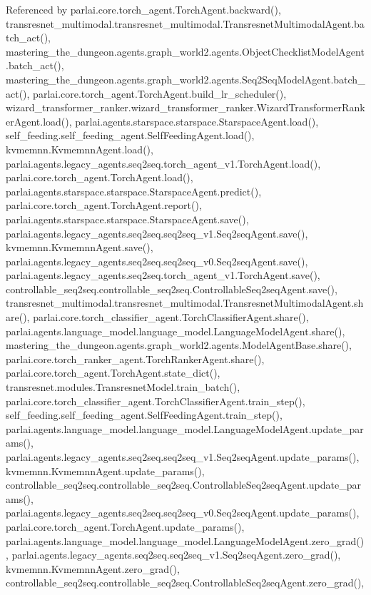 Referenced by parlai.\+core.\+torch\+\_\+agent.\+Torch\+Agent.\+backward(), transresnet\+\_\+multimodal.\+transresnet\+\_\+multimodal.\+Transresnet\+Multimodal\+Agent.\+batch\+\_\+act(), mastering\+\_\+the\+\_\+dungeon.\+agents.\+graph\+\_\+world2.\+agents.\+Object\+Checklist\+Model\+Agent.\+batch\+\_\+act(), mastering\+\_\+the\+\_\+dungeon.\+agents.\+graph\+\_\+world2.\+agents.\+Seq2\+Seq\+Model\+Agent.\+batch\+\_\+act(), parlai.\+core.\+torch\+\_\+agent.\+Torch\+Agent.\+build\+\_\+lr\+\_\+scheduler(), wizard\+\_\+transformer\+\_\+ranker.\+wizard\+\_\+transformer\+\_\+ranker.\+Wizard\+Transformer\+Ranker\+Agent.\+load(), parlai.\+agents.\+starspace.\+starspace.\+Starspace\+Agent.\+load(), self\+\_\+feeding.\+self\+\_\+feeding\+\_\+agent.\+Self\+Feeding\+Agent.\+load(), kvmemnn.\+Kvmemnn\+Agent.\+load(), parlai.\+agents.\+legacy\+\_\+agents.\+seq2seq.\+torch\+\_\+agent\+\_\+v1.\+Torch\+Agent.\+load(), parlai.\+core.\+torch\+\_\+agent.\+Torch\+Agent.\+load(), parlai.\+agents.\+starspace.\+starspace.\+Starspace\+Agent.\+predict(), parlai.\+core.\+torch\+\_\+agent.\+Torch\+Agent.\+report(), parlai.\+agents.\+starspace.\+starspace.\+Starspace\+Agent.\+save(), parlai.\+agents.\+legacy\+\_\+agents.\+seq2seq.\+seq2seq\+\_\+v1.\+Seq2seq\+Agent.\+save(), kvmemnn.\+Kvmemnn\+Agent.\+save(), parlai.\+agents.\+legacy\+\_\+agents.\+seq2seq.\+seq2seq\+\_\+v0.\+Seq2seq\+Agent.\+save(), parlai.\+agents.\+legacy\+\_\+agents.\+seq2seq.\+torch\+\_\+agent\+\_\+v1.\+Torch\+Agent.\+save(), controllable\+\_\+seq2seq.\+controllable\+\_\+seq2seq.\+Controllable\+Seq2seq\+Agent.\+save(), transresnet\+\_\+multimodal.\+transresnet\+\_\+multimodal.\+Transresnet\+Multimodal\+Agent.\+share(), parlai.\+core.\+torch\+\_\+classifier\+\_\+agent.\+Torch\+Classifier\+Agent.\+share(), parlai.\+agents.\+language\+\_\+model.\+language\+\_\+model.\+Language\+Model\+Agent.\+share(), mastering\+\_\+the\+\_\+dungeon.\+agents.\+graph\+\_\+world2.\+agents.\+Model\+Agent\+Base.\+share(), parlai.\+core.\+torch\+\_\+ranker\+\_\+agent.\+Torch\+Ranker\+Agent.\+share(), parlai.\+core.\+torch\+\_\+agent.\+Torch\+Agent.\+state\+\_\+dict(), transresnet.\+modules.\+Transresnet\+Model.\+train\+\_\+batch(), parlai.\+core.\+torch\+\_\+classifier\+\_\+agent.\+Torch\+Classifier\+Agent.\+train\+\_\+step(), self\+\_\+feeding.\+self\+\_\+feeding\+\_\+agent.\+Self\+Feeding\+Agent.\+train\+\_\+step(), parlai.\+agents.\+language\+\_\+model.\+language\+\_\+model.\+Language\+Model\+Agent.\+update\+\_\+params(), parlai.\+agents.\+legacy\+\_\+agents.\+seq2seq.\+seq2seq\+\_\+v1.\+Seq2seq\+Agent.\+update\+\_\+params(), kvmemnn.\+Kvmemnn\+Agent.\+update\+\_\+params(), controllable\+\_\+seq2seq.\+controllable\+\_\+seq2seq.\+Controllable\+Seq2seq\+Agent.\+update\+\_\+params(), parlai.\+agents.\+legacy\+\_\+agents.\+seq2seq.\+seq2seq\+\_\+v0.\+Seq2seq\+Agent.\+update\+\_\+params(), parlai.\+core.\+torch\+\_\+agent.\+Torch\+Agent.\+update\+\_\+params(), parlai.\+agents.\+language\+\_\+model.\+language\+\_\+model.\+Language\+Model\+Agent.\+zero\+\_\+grad(), parlai.\+agents.\+legacy\+\_\+agents.\+seq2seq.\+seq2seq\+\_\+v1.\+Seq2seq\+Agent.\+zero\+\_\+grad(), kvmemnn.\+Kvmemnn\+Agent.\+zero\+\_\+grad(), controllable\+\_\+seq2seq.\+controllable\+\_\+seq2seq.\+Controllable\+Seq2seq\+Agent.\+zero\+\_\+grad(), 